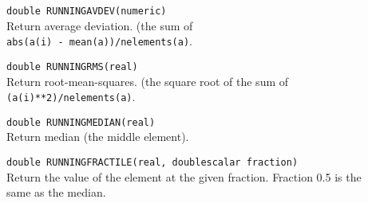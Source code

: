 \begin{description}
  \item[] \texttt{double RUNNINGAVDEV(numeric)}\\
    Return average deviation. (the sum of 
    \\\texttt{abs(a(i) - mean(a))/nelements(a)}.
  \item[] \texttt{double RUNNINGRMS(real)}\\
    Return root-mean-squares. (the square root of the sum of
    \\\texttt{(a(i)**2)/nelements(a)}.
  \item[] \texttt{double RUNNINGMEDIAN(real)}\\
    Return median (the middle element).
  \item[] \texttt{double RUNNINGFRACTILE(real, doublescalar fraction)}\\
    Return the value of the element at the given fraction.
    Fraction 0.5 is the same as the median.
\end{description}

